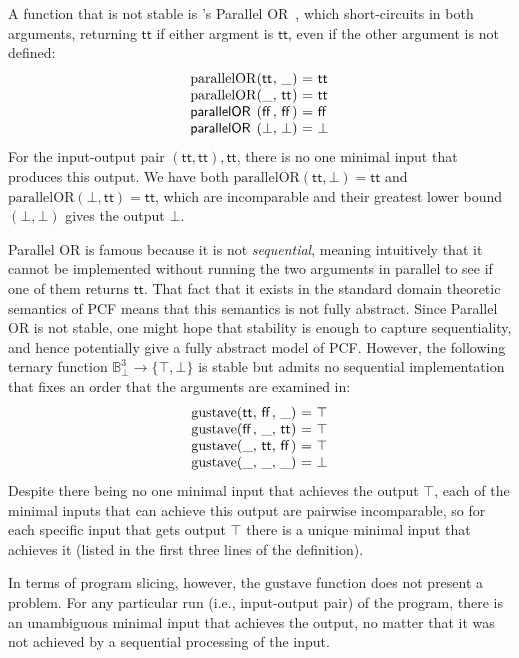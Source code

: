 \begin{example}
  A function that is not stable is \citeauthor{lcf77}'s Parallel OR~\citeyearpar{lcf77},
  which short-circuits in both arguments, returning $\mathsf{tt}$ if
  either argment is $\mathsf{tt}$, even if the other argument is not
  defined:
  \begin{displaymath}
    \begin{array}{l@{(}l@{,~}l@{)~}c@{~}l}
      \mathrm{parallelOR}&\mathsf{tt}&\_&=&\mathsf{tt} \\
      \mathrm{parallelOR}&\_&\mathsf{tt}&=&\mathsf{tt} \\
      \mathsf{parallelOR}&\mathsf{ff}&\mathsf{ff}&=&\mathsf{ff} \\
      \mathsf{parallelOR}&\bot&\bot&=&\bot
    \end{array}
  \end{displaymath}
  For the input-output pair $(\mathsf{tt},\mathsf{tt}),\mathsf{tt}$,
  there is no one minimal input that produces this output. We have
  both $\mathrm{parallelOR}(\mathsf{tt},\bot) = \mathsf{tt}$ and
  $\mathrm{parallelOR}(\bot,\mathsf{tt}) = \mathsf{tt}$, which are
  incomparable and their greatest lower bound $(\bot,\bot)$ gives the
  output $\bot$.

  Parallel OR is famous because it is not \emph{sequential}, meaning
  intuitively that it cannot be implemented without running the two
  arguments in parallel to see if one of them returns
  $\mathsf{tt}$. That fact that it exists in the standard domain
  theoretic semantics of PCF means that this semantics is not fully
  abstract. Since Parallel OR is not stable, one might hope that
  stability is enough to capture sequentiality, and hence potentially
  give a fully abstract model of PCF. However, the following ternary
  function $\mathbb{B}_\bot^3 \to \{\top,\bot\}$ is stable but admits
  no sequential implementation that fixes an order that the arguments
  are examined in:
  \begin{displaymath}
    \begin{array}{l@{(}l@{,~}l@{,~}l@{)~}c@{~}l}
      \mathrm{gustave}&\mathsf{tt}&\mathsf{ff}&\_&=&\top \\
      \mathrm{gustave}&\mathsf{ff}&\_&\mathsf{tt}&=&\top \\
      \mathrm{gustave}&\_&\mathsf{tt}&\mathsf{ff}&=&\top \\
      \mathrm{gustave}&\_&\_&\_&=&\bot
    \end{array}
  \end{displaymath}
  Despite there being no one minimal input that achieves the output
  $\top$, each of the minimal inputs that can achieve this output are
  pairwise incomparable, so for each specific input that gets output
  $\top$ there is a unique minimal input that achieves it (listed in
  the first three lines of the definition).

  In terms of program slicing, however, the $\mathrm{gustave}$
  function does not present a problem. For any particular run (i.e.,
  input-output pair) of the program, there is an unambiguous minimal
  input that achieves the output, no matter that it was not achieved
  by a sequential processing of the input.
\end{example}

